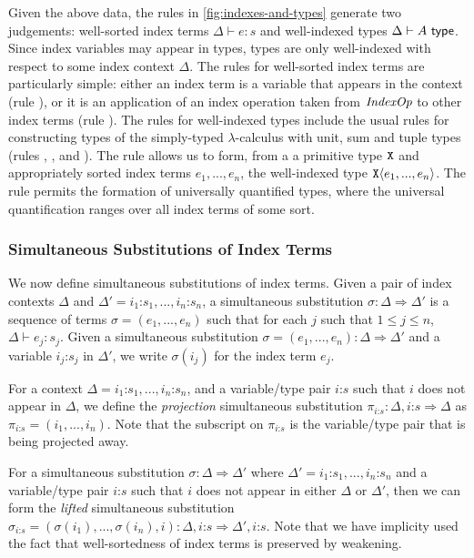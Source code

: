Given the above data, the rules in \autoref{fig:indexes-and-types}
generate two judgements: well-sorted index terms $\Delta \vdash e : s$
and well-indexed types $\Delta \vdash A \textsf{ type}$. Since index
variables may appear in types, types are only well-indexed with
respect to some index context $\Delta$. The rules for well-sorted
index terms are particularly simple: either an index term is a
variable that appears in the context (rule ), or it is
an application of an index operation taken from $\mathit{IndexOp}$ to other
index terms (rule ). The rules for well-indexed types
include the usual rules for constructing types of the simply-typed
$\lambda$-calculus with unit, sum and tuple types (rules
, ,  and
). The rule  allows us to form, from a
a primitive type $\texttt{X}$ and appropriately sorted index terms
$e_1,...,e_n$, the well-indexed type $\texttt{X}\langle e_1,...,e_n \rangle$. The
rule  permits the formation of universally
quantified types, where the universal quantification ranges over all
index terms of some sort.

\subsubsection{Simultaneous Substitutions of Index Terms}
\label{sec:simultaneous-substitution}

We now define simultaneous substitutions of index terms. Given a pair
of index contexts $\Delta$ and $\Delta' = i_1 \mathord: s_1, ..., i_n
\mathord: s_n$, a simultaneous substitution $\sigma : \Delta
\Rightarrow \Delta'$ is a sequence of terms $\sigma = (e_1,...,e_n)$
such that for each $j$ such that $1 \leq j \leq n$, $\Delta \vdash e_j
: s_j$. Given a simultaneous substitution $\sigma = (e_1,...,e_n) :
\Delta \Rightarrow \Delta'$ and a variable $i_j \mathord: s_j$ in
$\Delta'$, we write $\sigma(i_j)$ for the index term $e_j$.

For a context $\Delta = i_1\mathord:s_1,...,i_n\mathord:s_n$, and a
variable/type pair $i\mathord:s$ such that $i$ does not appear in
$\Delta$, we define the \emph{projection} simultaneous substitution
$\pi_{i\mathord:s} : \Delta,i\mathord:s \Rightarrow \Delta$ as
$\pi_{i\mathord:s} = (i_1,...,i_n)$. Note that the subscript on
$\pi_{i\mathord:s}$ is the variable/type pair that is being projected
away.

For a simultaneous substitution $\sigma : \Delta \Rightarrow \Delta'$
where $\Delta' = i_1\mathord:s_1,...,i_n\mathord:s_n$ and a
variable/type pair $i\mathord:s$ such that $i$ does not appear in
either $\Delta$ or $\Delta'$, then we can form the \emph{lifted}
simultaneous substitution $\sigma_{i\mathord:s} = (\sigma(i_1), ...,
\sigma(i_n), i) : \Delta,i\mathord:s \Rightarrow
\Delta',i\mathord:s$. Note that we have implicity used the fact that
well-sortedness of index terms is preserved by weakening.

